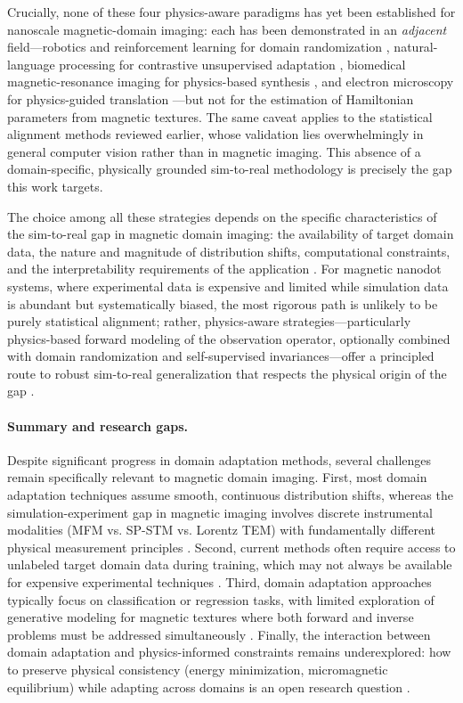 \documentclass[letterpaper, 12, one column]{article}
\begin{document}
Crucially, none of these four physics-aware paradigms has yet been established for nanoscale magnetic-domain imaging: each has been demonstrated in an \emph{adjacent} field---robotics and reinforcement learning for domain randomization \cite{chen2022understanding}, natural-language processing for contrastive unsupervised adaptation \cite{long2022domain}, biomedical magnetic-resonance imaging for physics-based synthesis \cite{yang2023physics}, and electron microscopy for physics-guided translation \cite{khan2023leveraging}---but not for the estimation of Hamiltonian parameters from magnetic textures. The same caveat applies to the statistical alignment methods reviewed earlier, whose validation lies overwhelmingly in general computer vision rather than in magnetic imaging. This absence of a domain-specific, physically grounded sim-to-real methodology is precisely the gap this work targets.

The choice among all these strategies depends on the specific characteristics of the sim-to-real gap in magnetic domain imaging: the availability of target domain data, the nature and magnitude of distribution shifts, computational constraints, and the interpretability requirements of the application \cite{Wilson2020Survey}. For magnetic nanodot systems, where experimental data is expensive and limited while simulation data is abundant but systematically biased, the most rigorous path is unlikely to be purely statistical alignment; rather, physics-aware strategies---particularly physics-based forward modeling of the observation operator, optionally combined with domain randomization and self-supervised invariances---offer a principled route to robust sim-to-real generalization that respects the physical origin of the gap \cite{Hilgers2025,yang2023physics}.

\paragraph{Summary and research gaps.}
Despite significant progress in domain adaptation methods, several challenges remain specifically relevant to magnetic domain imaging. First, most domain adaptation techniques assume smooth, continuous distribution shifts, whereas the simulation-experiment gap in magnetic imaging involves discrete instrumental modalities (MFM vs. SP-STM vs. Lorentz TEM) with fundamentally different physical measurement principles \cite{Guan2021Domain}. Second, current methods often require access to unlabeled target domain data during training, which may not always be available for expensive experimental techniques \cite{Chronopoulou2024Efficient}. Third, domain adaptation approaches typically focus on classification or regression tasks, with limited exploration of generative modeling for magnetic textures where both forward and inverse problems must be addressed simultaneously \cite{Park2024}. Finally, the interaction between domain adaptation and physics-informed constraints remains underexplored: how to preserve physical consistency (energy minimization, micromagnetic equilibrium) while adapting across domains is an open research question \cite{Sun2022Applications}.
\end{document}

